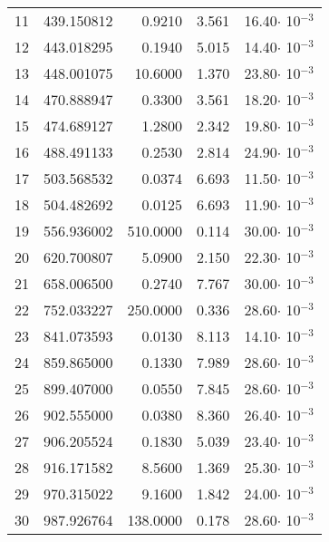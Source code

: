 \begin{longtable}{rrrrr}
11    &   439.150812&    0.9210&  3.561&   16.40$\cdot$ 10$^{-3}$\\
12    &   443.018295&    0.1940&  5.015&   14.40$\cdot$ 10$^{-3}$\\
13    &   448.001075&   10.6000&  1.370&   23.80$\cdot$ 10$^{-3}$\\
14    &   470.888947&    0.3300&  3.561&   18.20$\cdot$ 10$^{-3}$\\
15    &   474.689127&    1.2800&  2.342&   19.80$\cdot$ 10$^{-3}$\\
16    &   488.491133&    0.2530&  2.814&   24.90$\cdot$ 10$^{-3}$\\
17    &   503.568532&    0.0374&  6.693&   11.50$\cdot$ 10$^{-3}$\\
18    &   504.482692&    0.0125&  6.693&   11.90$\cdot$ 10$^{-3}$\\
19    &   556.936002&  510.0000&  0.114&   30.00$\cdot$ 10$^{-3}$\\
20    &   620.700807&    5.0900&  2.150&   22.30$\cdot$ 10$^{-3}$\\
21    &   658.006500&    0.2740&  7.767&   30.00$\cdot$ 10$^{-3}$\\
22    &   752.033227&  250.0000&  0.336&   28.60$\cdot$ 10$^{-3}$\\
23    &   841.073593&    0.0130&  8.113&   14.10$\cdot$ 10$^{-3}$\\
24    &   859.865000&    0.1330&  7.989&   28.60$\cdot$ 10$^{-3}$\\
25    &   899.407000&    0.0550&  7.845&   28.60$\cdot$ 10$^{-3}$\\
26    &   902.555000&    0.0380&  8.360&   26.40$\cdot$ 10$^{-3}$\\
27    &   906.205524&    0.1830&  5.039&   23.40$\cdot$ 10$^{-3}$\\
28    &   916.171582&    8.5600&  1.369&   25.30$\cdot$ 10$^{-3}$\\
29    &   970.315022&    9.1600&  1.842&   24.00$\cdot$ 10$^{-3}$\\
30    &   987.926764&  138.0000&  0.178&   28.60$\cdot$ 10$^{-3}$\\
\hline
\end{longtable}


